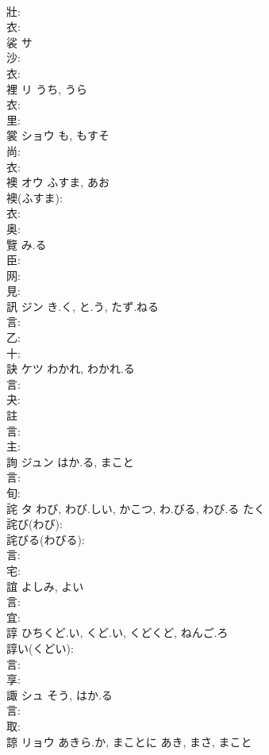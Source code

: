 \documentclass[8pt]{extreport}
\begin{document}
\begin{CJK}{UTF8}{min}
\\	壯: 
\\	衣: 
\\	裟	サ			
\\	沙: 
\\	衣: 
\\	裡	リ	うち, うら		
\\	衣: 
\\	里: 
\\	裳	ショウ	も, もすそ		
\\	尚: 
\\	衣: 
\\	襖	オウ	ふすま, あお		
\\	襖(ふすま): 
\\	衣: 
\\	奥: 
\\	覽		み.る				
\\	臣: 
\\	网: 
\\	見: 
\\	訊	ジン	き.く, と.う, たず.ねる		
\\	言: 
\\	乙: 
\\	十: 
\\	訣	ケツ	わかれ, わかれ.る		
\\	言: 
\\	夬: 
\\	註					
\\	言: 
\\	主: 
\\	詢	ジュン	はか.る, まこと		
\\	言: 
\\	旬: 
\\	詫	タ	わび, わび.しい, かこつ, わ.びる, わび.る	たく	
\\	詫び(わび): 
\\	詫びる(わびる): 
\\	言: 
\\	宅: 
\\	誼		よしみ, よい			
\\	言: 
\\	宜: 
\\	諄		ひちくど.い, くど.い, くどくど, ねんご.ろ			
\\	諄い(くどい): 
\\	言: 
\\	享: 
\\	諏	シュ	そう, はか.る		
\\	言: 
\\	取: 
\\	諒	リョウ	あきら.か, まことに	あき, まさ, まこと	

\end{CJK}
\end{document}
